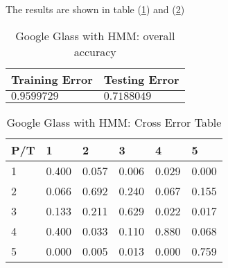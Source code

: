 \begin{itemize}
The results are shown in table (\ref{tab:glassHMM1}) and (\ref{tab:glassHMM2})
\begin{table}
\begin{center}
\begin{tabular}{|l|l|}
      \hline
      Training Error & Testing Error\\
      \hline
      $0.9599729$ & $0.7188049$ \\
      \hline
\end{tabular}
\caption{Google Glass with HMM: overall accuracy}
\label{tab:glassHMM1}
\end{center}
\end{table}
\begin{table}
\begin{center}
\begin{tabular}{|l|l|l|l|l|l|}
      \hline
      P/T& 1 & 2 &3 & 4 & 5 \\
      \hline
      1 &0.400&0.057&0.006&0.029&0.000\\
      2 &0.066&0.692&0.240&0.067&0.155\\
      3 &0.133&0.211&0.629&0.022&0.017\\
      4 &0.400&0.033&0.110&0.880&0.068\\
      5 & 0.000&0.005&0.013&0.000&0.759\\
      \hline
\end{tabular}
\caption{Google Glass with HMM: Cross Error Table}
\label{tab:glassHMM2}
\end{center}
\end{table}

\end{itemize}


